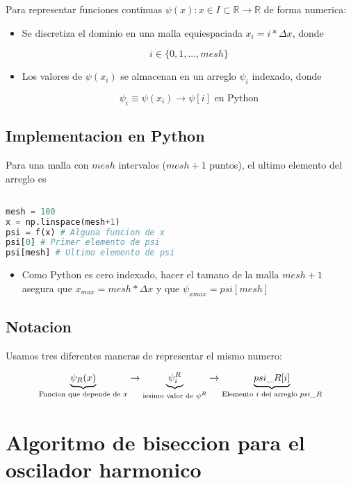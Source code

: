 \documentclass[11pt]{article}
\begin{document}
Para representar funciones continuas \(\psi(x) : x\in I \subset \mathbb{R} \to \mathbb{R}\) de forma numerica:

\begin{itemize}
\item Se discretiza el dominio en una malla equiespaciada \(x_i = i*\Delta x\), donde

\[ i \in \{0,1,...,mesh\} \]

\item Los valores de \(\psi(x_i)\) se almacenan en un arreglo \(\psi_i\) indexado, donde

\[ \psi_i \equiv \psi(x_i) \to \psi[i] \text{ en Python} \]
\end{itemize}
\subsection{Implementacion en Python}
\label{sec:org0ac15c8}

Para una malla con \(mesh\) intervalos (\(mesh + 1\) puntos), el ultimo elemento del arreglo es

\begin{lstlisting}[language=Python,numbers=none]

mesh = 100
x = np.linspace(mesh+1)
psi = f(x) # Alguna funcion de x
psi[0] # Primer elemento de psi
psi[mesh] # Ultimo elemento de psi

\end{lstlisting}

\begin{itemize}
\item Como Python es cero indexado, hacer el tamano de la malla \(mesh + 1\) asegura que \(x_{max} = mesh * \Delta x\) y que \(\psi_{xmax} = psi[mesh]\)
\end{itemize}
\subsection{Notacion}
\label{sec:org2b2993a}

Usamos tres diferentes maneras de representar el mismo numero:

\[ \underbrace{\psi_R(x)}_{\text{Funcion que depende de \( x \)}} \to \underbrace{\psi_i^R}_{\text{iesimo valor de \( \psi^R \)}} \to \underbrace{psi\_R[i]}_{\text{Elemento \( i \) del arreglo \( psi\_R \)}} \]
\section{Algoritmo de biseccion para el oscilador harmonico}
\label{sec:org1a96e36}
\end{document}
